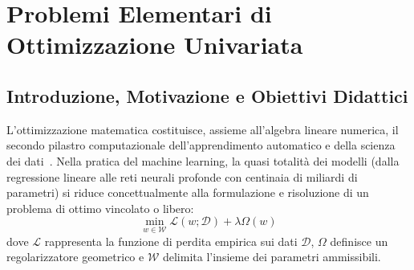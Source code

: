 \chapter{Problemi Elementari di Ottimizzazione Univariata}
\label{chap:problemi-semplici-ottimizzazione}

\FloatBarrier
\section{Introduzione, Motivazione e Obiettivi Didattici}
\label{sec:opt-intro-motivazione}

L'ottimizzazione matematica costituisce, assieme all'algebra lineare numerica, il secondo pilastro computazionale dell'apprendimento automatico e della scienza dei dati~\cite{boyd2004convex,nocedal2006numerical}. Nella pratica del machine learning, la quasi totalit\`a dei modelli (dalla regressione lineare alle reti neurali profonde con centinaia di miliardi di parametri) si riduce concettualmente alla formulazione e risoluzione di un problema di ottimo vincolato o libero:
\begin{equation}
\min_{w \in \mathcal{W}} \mathcal{L}(w; \mathcal{D}) + \lambda \Omega(w)
\end{equation}
dove $\mathcal{L}$ rappresenta la funzione di perdita empirica sui dati $\mathcal{D}$, $\Omega$ definisce un regolarizzatore geometrico e $\mathcal{W}$ delimita l'insieme dei parametri ammissibili.

